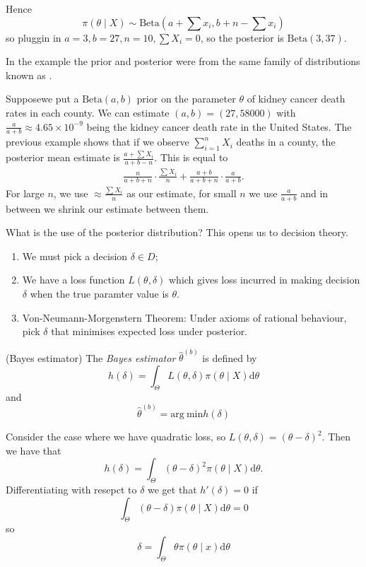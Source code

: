 \documentclass{article}
\begin{document}
Hence
\[
	\pi(\theta\mid X) \sim \text{Beta}(a+\sum x_i, b+n-\sum x_i)
\]
so pluggin in $ a=3,b=27,n=10,\sum X_i = 0 $, so the posterior is $ \text{Beta}(3,37) $.
\begin{remark}
	In the example the prior and posterior were from the same family of distributions known as .
\end{remark}
Supposewe put a $ \text{Beta}(a,b) $ prior on the parameter $ \theta $ of kidney cancer death rates in each county. We can estimate $ (a,b)=(27, 58000) $ with $ \frac a{a+b}\approx 4.65\times 10^{-9} $ being the kidney cancer death rate in the United States. The previous example shows that if we observe $ \sum_{i=1}^n X_i$ deaths in a county, the posterior mean estimate is $ \frac{a+\sum X_i}{a+b-n} $. This is equal to
\begin{align*}
	\frac n{a+b+n}\cdot\frac{\sum X_i}n + \frac{a+b}{a+b+n}\cdot \frac a{a+b}.
\end{align*}
For large $ n $, we use $ \approx \frac{\sum X_i}n $ as our estimate, for small $ n $ we use $ \frac a{a+b} $ and in between we shrink our estimate between them.\par
What is the use of the posterior distribution? This opens us to decision theory.
\begin{enumerate}
	\item We must pick a decision $ \delta \in D $;
	\item We have a loss function $ L(\theta,\delta) $ which gives loss incurred in making decision $ \delta $ when the true paramter value is $ \theta $.
	\item Von-Neumann-Morgenstern Theorem: Under axioms of rational behaviour, pick $ \delta $ that minimises expected loss under posterior.
\end{enumerate}
\begin{definition}
	(Bayes estimator) The \textit{Bayes estimator} $ \hat\theta^{(b)} $ is defined by
	\[
	  h(\delta) = \int_\Theta L(\theta,\delta)\pi(\theta\mid X)\mathrm d\theta
	\]
and
\[
	\hat \theta^{(b)}= \mathrm{arg}\ \mathrm{min} h(\delta)
\]
\end{definition}
Consider the case where we have quadratic loss, so $ L(\theta,\delta) = (\theta-\delta)^2 $. Then we have that
\[
  h(\delta) =\int_\Theta (\theta-\delta)^2\pi(\theta\mid X)\mathrm d\theta.
\]
Differentiating with resepct to $ \delta $ we get that $ h'(\delta)=0 $ if
\[
  \int_\Theta (\theta-\delta)\pi(\theta\mid X)\mathrm d\theta = 0
\]
so
\[
  \delta = \int_\Theta \theta \pi(\theta\mid x)\mathrm d\theta
\]
\end{document}
